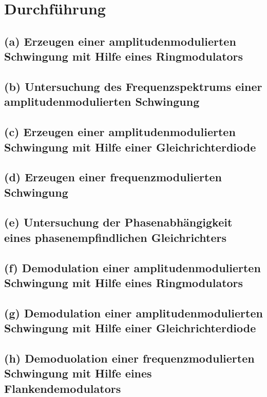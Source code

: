 \section{Durchführung}
\label{sec:Durchführung}

\subsection{(a) Erzeugen einer amplitudenmodulierten Schwingung mit
Hilfe eines Ringmodulators}
\label{subsubsec:durchfuehrung_a}


\subsection{(b) Untersuchung des Frequenzspektrums einer
amplitudenmodulierten Schwingung}
\label{subsubsec:durchfuehrung_b}


\subsection{(c) Erzeugen einer amplitudenmodulierten Schwingung
mit Hilfe einer Gleichrichterdiode}
\label{subsubsec:durchfuehrung_c}


\subsection{(d) Erzeugen einer frequenzmodulierten Schwingung}
\label{subsubsec:durchfuehrung_d}


\subsection{(e) Untersuchung der Phasenabhängigkeit eines
phasenempfindlichen Gleichrichters}
\label{subsubsec:durchfuehrung_e}


\subsection{(f) Demodulation einer amplitudenmodulierten Schwingung
mit Hilfe eines Ringmodulators}
\label{subsubsec:durchfuehrung_f}


\subsection{(g) Demodulation einer amplitudenmodulierten Schwingung
mit Hilfe einer Gleichrichterdiode}
\label{subsubsec:durchfuehrung_g}


\subsection{(h) Demoduolation einer frequenzmodulierten Schwingung
mit Hilfe eines Flankendemodulators}
\label{subsubsec:durchfuehrung_h}
